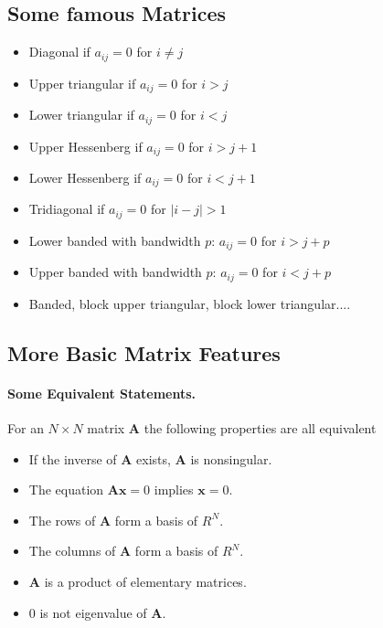 \documentclass[%
oneside,                 %
final,                   %
10pt]{article}
\begin{document}
\noindent



\subsection*{Some famous Matrices}

\begin{itemize}
  \item Diagonal if $a_{ij}=0$ for $i\ne j$

  \item Upper triangular if $a_{ij}=0$ for $i > j$

  \item Lower triangular if $a_{ij}=0$ for $i < j$

  \item Upper Hessenberg if $a_{ij}=0$ for $i > j+1$

  \item Lower Hessenberg if $a_{ij}=0$ for $i < j+1$

  \item Tridiagonal if $a_{ij}=0$ for $|i -j| > 1$

  \item Lower banded with bandwidth $p$: $a_{ij}=0$ for $i > j+p$

  \item Upper banded with bandwidth $p$: $a_{ij}=0$ for $i < j+p$

  \item Banded, block upper triangular, block lower triangular....
\end{itemize}

\noindent
\subsection*{More Basic Matrix Features}


\paragraph{Some Equivalent Statements.}
For an $N\times N$ matrix  $\mathbf{A}$ the following properties are all equivalent

\begin{itemize}
  \item If the inverse of $\mathbf{A}$ exists, $\mathbf{A}$ is nonsingular.

  \item The equation $\mathbf{Ax}=0$ implies $\mathbf{x}=0$.

  \item The rows of $\mathbf{A}$ form a basis of $R^N$.

  \item The columns of $\mathbf{A}$ form a basis of $R^N$.

  \item $\mathbf{A}$ is a product of elementary matrices.

  \item $0$ is not eigenvalue of $\mathbf{A}$.
\end{itemize}
\end{document}
